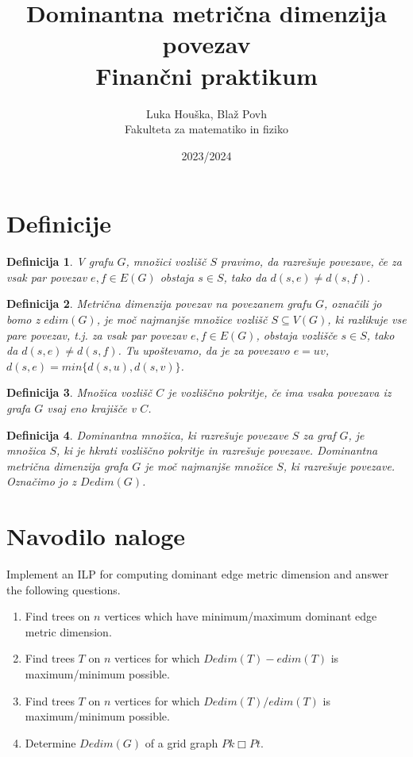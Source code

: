 \documentclass[a4paper,12pt]{article}
\title{Dominantna metrična dimenzija povezav \\ 
\Large Finančni praktikum}
\author{Luka Houška, Blaž Povh \\
Fakulteta za matematiko in fiziko}
\date{2023/2024}
\newtheorem{definicija}{Definicija}
\begin{document}
\maketitle

\section{Definicije}
    \begin{definicija}
        V grafu $G$, množici vozlišč $S$ pravimo, da razrešuje povezave, če za vsak par povezav $e, f \in E(G)$ obstaja $s \in S$, tako da $d(s, e) \neq  d(s, f)$.
    \end{definicija}

    \begin{definicija}
        Metrična dimenzija povezav na  povezanem grafu $G$, označili jo bomo z $edim(G)$, je moč najmanjše množice vozlišč $S\subseteq V(G)$, ki razlikuje vse pare povezav, t.j. za vsak par povezav $e, f \in E(G)$, obstaja vozlišče $s \in S$, tako da $d(s, e) \neq d(s, f )$. Tu upoštevamo, da je za povezavo $e=uv$, $d(s, e) = min\{d(s, u), d(s, v)\}$.
    \end{definicija}
        
    \begin{definicija}
        Množica vozlišč $C$ je \emph{vozliščno pokritje}, če ima vsaka povezava iz grafa $G$ vsaj eno krajišče v $C$.
    \end{definicija}

    \begin{definicija}
        Dominantna množica, ki razrešuje povezave $S$ za graf $G$, je množica $S$, ki je hkrati vozliščno pokritje in razrešuje povezave. Dominantna metrična dimenzija grafa $G$ je moč najmanjše množice $S$, ki razrešuje povezave. Označimo jo z $Dedim(G)$.
    \end{definicija}

\section{Navodilo naloge}
    Implement an ILP for computing dominant edge metric dimension and answer the following questions.
    \begin{enumerate}
        \item Find trees on $n$ vertices which have minimum/maximum dominant edge metric dimension.
        \item Find trees $T$ on $n$ vertices for which $Dedim(T) - edim(T)$ is maximum/minimum possible.
        \item Find trees $T$ on $n$ vertices for which $Dedim(T)/ edim(T)$ is maximum/minimum possible.
        \item Determine $Dedim(G)$ of a grid graph $Pk \Box Pt$.
    \end{enumerate}
\end{document}
